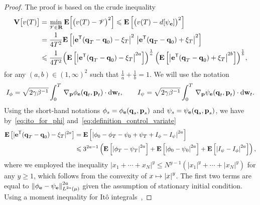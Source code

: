 \documentclass[11pt,a4paper]{article}
\begin{document}
\begin{proof}
    The proof is based on the crude inequality
    \begin{align}
        \notag
        \mathbf{V} \bigl[v(T)\bigr]
        &= \min_{\mathscr V \in \mathbf R} \mathbf{E} \Bigl[\bigl(v(T) - \mathscr V\bigr)^2\Bigr]
        \leqslant \mathbf{E} \left[ \bigl( v(T) - d[\psi_{\boldsymbol{\mathbf e}}] \bigr)^2 \right] \\
        &= \frac{1}{4 T^2} \mathbf{E} \left[ \left\lvert \boldsymbol{\mathbf e}^\mathsf T (\boldsymbol{\mathbf q}_T - \boldsymbol{\mathbf q}_0) - \xi_T \right\rvert^2 \, \left\lvert \boldsymbol{\mathbf e}^\mathsf T (\boldsymbol{\mathbf q}_T - \boldsymbol{\mathbf q}_0) + \xi_T \right\rvert^2 \right] \\
        \label{eq:bound_variance_two_factors}
        &\leqslant \frac{1}{4 T^2}
        {\left(\mathbf{E} \left[  \left\lvert \boldsymbol{\mathbf e}^\mathsf T(\boldsymbol{\mathbf q}_T - \boldsymbol{\mathbf q}_0) - \xi_T \right\rvert^{2a} \right]\right)^{\frac{1}{a}}} \,
        {\left(\mathbf{E} \left[ \left\lvert \boldsymbol{\mathbf e}^\mathsf T (\boldsymbol{\mathbf q}_T - \boldsymbol{\mathbf q}_0) + \xi_T \right\rvert^{2b} \right]\right)^{\frac{1}{b}}},
    \end{align}
    for any $(a, b) \in (1, \infty)^2$ such that $\frac{1}{a} + \frac{1}{b} = 1$.
    We will use the notation
    \[
        I_{\phi} = \sqrt{2 \gamma \beta^{-1}} \int_{0}^{T} \, \nabla_{\boldsymbol{\mathbf p}} \phi_{\boldsymbol{\mathbf e}} (\boldsymbol{\mathbf q}_t, \boldsymbol{\mathbf p}_t) \cdot \mathrm d \boldsymbol{\mathbf w}_t,
        \qquad
        I_{\psi} = \sqrt{2 \gamma \beta^{-1}} \int_{0}^{T} \, \nabla_{\boldsymbol{\mathbf p}} \psi_{\boldsymbol{\mathbf e}} (\boldsymbol{\mathbf q}_t, \boldsymbol{\mathbf p}_t) \cdot \mathrm d \boldsymbol{\mathbf w}_t.
    \]
    Using the short-hand notations $\phi_{s} = \phi_{\boldsymbol{\mathbf e}}(\boldsymbol{\mathbf q}_s, \boldsymbol{\mathbf p}_s)$ and $\psi_{s} = \psi_{\boldsymbol{\mathbf e}}(\boldsymbol{\mathbf q}_s, \boldsymbol{\mathbf p}_s)$,
    we have by~\eqref{eq:ito_for_phi} and~\eqref{eq:definition_control_variate}
    \begin{align*}
        \expect \left[ |\vect e^\t(\vect q_T - \vect q_0) - \xi_T|^{2 a} \right]
        &= \expect \left[ \abs{\phi_{0} - \phi_{T} - \psi_{0} + \psi_{T}  + I_{\phi} - I_{\psi}}^{2 a} \right] \\
        &\leq 3^{2 a-1} \left( \expect \left[ \abs{\phi_T - \psi_T}^{2 a} \right] + \expect \left[ \abs{\phi_0 - \psi_0}^{2 a} \right] + \expect \left[ \abs{I_{\psi} - I_{\phi}}^{2 a} \right] \right),
    \end{align*}
    where we employed the inequality $|x_1 + \dotsb + x_N|^{y} \leq N^{y-1} \left( |x_1|^y + \dotsb + |x_N|^y \right)$ for any $y \geq 1$,
    which follows from the convexity of $x \mapsto \abs{x}^y$.
    The first two terms are equal to $\norm{\phi_{\vect e} - \psi_{\vect e}}_{L^{2 a}(\mu)}^{2 a}$
    given the assumption of stationary initial condition.
    Using a moment inequality for It\^o integrals~\cite[Theorem 7.1]{MR2380366},

\end{proof}
\end{document}
